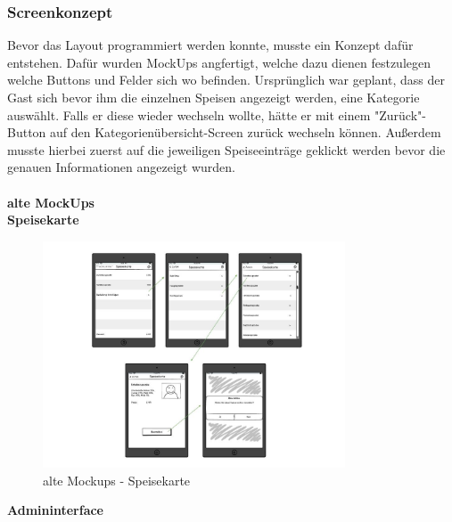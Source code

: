     \subsubsection{Screenkonzept}
Bevor das Layout programmiert werden konnte, musste ein Konzept dafür entstehen. Dafür wurden MockUps angfertigt, welche dazu dienen festzulegen welche Buttons und Felder sich wo befinden.
Ursprünglich war geplant, dass der Gast sich bevor ihm die einzelnen Speisen angezeigt werden, eine Kategorie auswählt. Falls er diese wieder wechseln wollte, hätte er mit einem "Zurück"-Button auf den Kategorienübersicht-Screen zurück wechseln können. Außerdem musste hierbei zuerst auf die jeweiligen Speiseeinträge geklickt werden bevor die genauen Informationen angezeigt wurden.
\\ \\
\textbf{alte MockUps}\\
\textbf{Speisekarte}\\
			\begin{figure}[H]
			\begin{centering}
			\includegraphics[width = 0.8\textwidth]{Bilder/Jok_alte_mockups.jpg}
			\par\end{centering}
			\caption{alte Mockups - Speisekarte}
			\label{alte Mockups - Speisekarte}
			\end{figure}\textbf{Admininterface}\\
